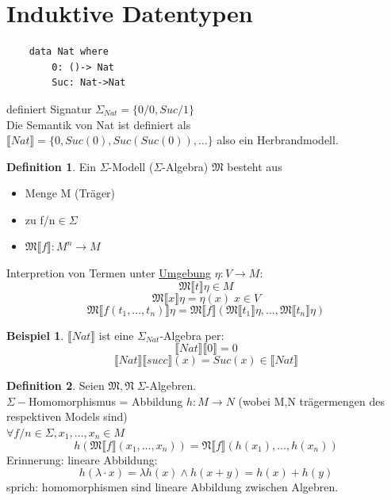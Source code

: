 \documentclass{article}
\theoremstyle{definition}
\newtheorem{beispiel}{Beispiel}[section]
\newtheorem{definition}{Definition}[section]
\begin{document}
	\section{Induktive Datentypen}
	\begin{verbatim}
	data Nat where
		0: ()-> Nat
		Suc: Nat->Nat
	\end{verbatim}
	definiert Signatur $\Sigma_{Nat} = \{0/0,Suc/1\}$\\
	Die Semantik von Nat ist definiert als\\
	$\llbracket Nat\rrbracket=\{0,Suc(0),Suc(Suc(0)),\dots\}$ also ein Herbrandmodell.\\
	\begin{definition} Ein $\Sigma$-Modell ($\Sigma$-Algebra) $\mathfrak{M}$ besteht aus\\
	\begin{itemize}
		\item Menge M (Träger)
		\item zu f/n$\in\Sigma$
		\item $\mathfrak{M}\llbracket f\rrbracket:M^n\to M$
	\end{itemize}
	Interpretion von Termen unter \underline{Umgebung} $\eta:V\to M:$\\
	\[\mathfrak{M}\llbracket t\rrbracket\eta \in M\]
	\[\mathfrak{M}\llbracket x\rrbracket\eta= \eta(x)\; x\in V\]
	\[\mathfrak{M}\llbracket f(t_1,\dots,t_n)\rrbracket\eta= \mathfrak{M}\llbracket f\rrbracket(\mathfrak{M}\llbracket t_1\rrbracket\eta,\dots,\mathfrak{M}\llbracket t_n\rrbracket\eta)\]
	\end{definition}
	\newcommand{\dbrack}[1]{\llbracket #1\rrbracket}
	\begin{beispiel} $\dbrack{Nat}$ ist eine $\Sigma_{Nat}$-Algebra per:\\
	\[\dbrack{Nat}\dbrack{0} = 0\]
	\[\dbrack{Nat}\dbrack{succ}(x) = Suc(x)\in\dbrack{Nat}\]
	\end{beispiel}
	\begin{definition} Seien $\mathfrak{M},\mathfrak{N}\; \Sigma$-Algebren.\\
	$\Sigma-$Homomorphismus = Abbildung $h:M\to N$ (wobei M,N trägermengen des respektiven Models sind)\\
	$\forall f/n \in \Sigma, x_1,\dots, x_n\in M$
	\[h(\mathfrak{M}\dbrack{f}(x_1,\dots,x_n)) = \mathfrak{N}\dbrack{f}(h(x_1),\dots,h(x_n))\]
	Erinnerung: lineare Abbildung:
	\[ h(\lambda \cdot x) = \lambda h(x)\land h(x+y)=h(x)+h(y)\]
	sprich: homomorphismen sind lineare Abbildung zwischen Algebren.\\
	\end{definition}
\end{document}
